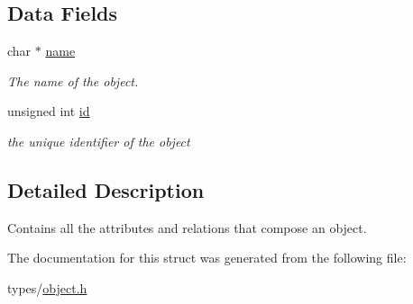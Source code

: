 \subsection*{Data Fields}
\begin{DoxyCompactItemize}
\item 
char $\ast$ \hyperlink{struct_object_a5ac083a645d964373f022d03df4849c8}{name}\hypertarget{struct_object_a5ac083a645d964373f022d03df4849c8}{}\label{struct_object_a5ac083a645d964373f022d03df4849c8}

\begin{DoxyCompactList}\small\item\em The name of the object. \end{DoxyCompactList}\item 
unsigned int \hyperlink{struct_object_ab7ce6f462afaf105224b0ca772a33c43}{id}\hypertarget{struct_object_ab7ce6f462afaf105224b0ca772a33c43}{}\label{struct_object_ab7ce6f462afaf105224b0ca772a33c43}

\begin{DoxyCompactList}\small\item\em the unique identifier of the object \end{DoxyCompactList}\end{DoxyCompactItemize}


\subsection{Detailed Description}
Contains all the attributes and relations that compose an object. 

The documentation for this struct was generated from the following file\+:\begin{DoxyCompactItemize}
\item 
types/\hyperlink{object_8h}{object.\+h}\end{DoxyCompactItemize}
